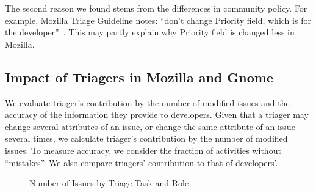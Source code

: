 \documentclass[conference]{IEEEtran}
\begin{document}
The second reason we found stems from the differences in community
policy.  For example, Mozilla Triage Guideline notes: ``don't change
  Priority field, which is for the
  developer''~\cite{mztriage}. This may partly explain why
Priority field is changed less in Mozilla.


\begin{comment}
Unlike code contributors, many triagers are
non-developer volunteers. For example, Gnome established a triage
team, Bug-Squad, to encourage volunteers who ``do not need any programming
knowledge'' to ``return something to the GNOME community if you
cannot program at all'' in order to ``make sure that major bugs do
not go unnoticed by
developers''~\footnotemark[2]. %
In this study we focus on triage done by non-developers, and investigate
their contributions to the community. The term $triager$ used in
later sections specifically refers to these contributors.
\end{comment}

\subsection{Impact of Triagers in Mozilla and Gnome}\label{ss:impact}
We evaluate triager's contribution by the number of modified issues
and the accuracy of the information they provide to developers.
Given that a triager may change several attributes of an issue, or
change the same attribute of an issue several times, we calculate
triager's contribution by the number of modified issues.  To measure
accuracy, we consider the fraction of activities without
``mistakes''. We also compare triagers' contribution to that of
developers'.

\begin{figure}[t]
\begin{centering}
\vspace{0.1in}
\end{centering}
\vspace{-0in}\caption{Number of Issues by Triage Task and Role}
\label{fig:impact_amount}
\end{figure}
\end{document}
